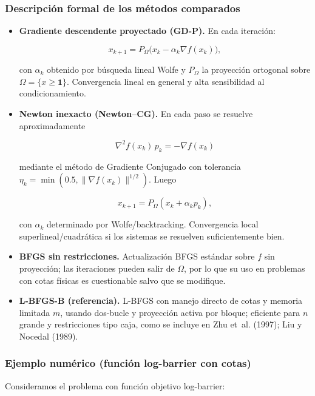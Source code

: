 \documentclass[
  spanish,
  us-letterpaper,
]{scrreprt}
\numberwithin{equation}{section}
\begin{document}
\subsubsection{Descripción formal de los métodos
comparados}\label{descripciuxf3n-formal-de-los-muxe9todos-comparados}

\begin{itemize}
\item
  \textbf{Gradiente descendente proyectado (GD-P).} En cada iteración:

  \[
  x_{k+1} = P_\Omega\big(x_k - \alpha_k \nabla f(x_k)\big),
  \]

  con \(\alpha_k\) obtenido por búsqueda lineal Wolfe y \(P_\Omega\) la
  proyección ortogonal sobre \(\Omega=\{x\ge\mathbf{1}\}\). Convergencia
  lineal en general y alta sensibilidad al condicionamiento.
\item
  \textbf{Newton inexacto (Newton--CG).} En cada paso se resuelve
  aproximadamente

  \[
  \nabla^2 f(x_k)\, p_k = -\nabla f(x_k)
  \]

  mediante el método de Gradiente Conjugado con tolerancia
  \(\eta_k = \min(0.5,\|\nabla f(x_k)\|^{1/2})\). Luego

  \[
  x_{k+1} = P_\Omega(x_k + \alpha_k p_k),
  \]

  con \(\alpha_k\) determinado por Wolfe/backtracking. Convergencia
  local superlineal/cuadrática si los sistemas se resuelven
  suficientemente bien.
\item
  \textbf{BFGS sin restricciones.} Actualización BFGS estándar sobre
  \(f\) sin proyección; las iteraciones pueden salir de \(\Omega\), por
  lo que su uso en problemas con cotas físicas es cuestionable salvo que
  se modifique.
\item
  \textbf{L-BFGS-B (referencia).} L-BFGS con manejo directo de cotas y
  memoria limitada \(m\), usando dos-bucle y proyección activa por
  bloque; eficiente para \(n\) grande y restricciones tipo caja, como se
  incluye en Zhu et~al. (1997); Liu y Nocedal (1989).
\end{itemize}

\subsubsection{Ejemplo numérico (función log-barrier con
cotas)}\label{ejemplo-numuxe9rico-funciuxf3n-log-barrier-con-cotas}

Consideramos el problema con función objetivo log-barrier:
\end{document}
